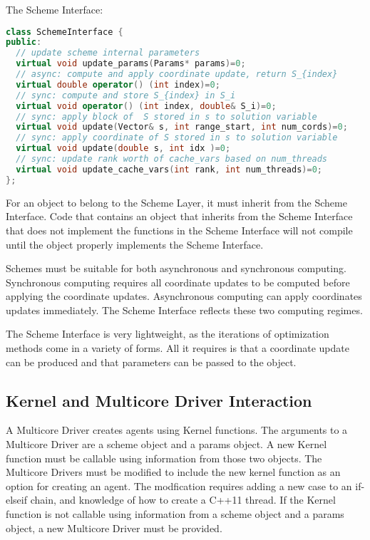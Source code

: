 The Scheme Interface:
\begin{lstlisting}[language=C++]
class SchemeInterface {
public:
  // update scheme internal parameters
  virtual void update_params(Params* params)=0;
  // async: compute and apply coordinate update, return S_{index}
  virtual double operator() (int index)=0;
  // sync: compute and store S_{index} in S_i
  virtual void operator() (int index, double& S_i)=0;
  // sync: apply block of  S stored in s to solution variable
  virtual void update(Vector& s, int range_start, int num_cords)=0;
  // sync: apply coordinate of S stored in s to solution variable
  virtual void update(double s, int idx )=0;
  // sync: update rank worth of cache_vars based on num_threads
  virtual void update_cache_vars(int rank, int num_threads)=0;
};
\end{lstlisting}
For an object to belong to the Scheme Layer, it must inherit from the Scheme Interface.
Code that contains an object that inherits from the Scheme Interface that does not implement the functions in the Scheme Interface will not compile until the object properly implements the Scheme Interface.

Schemes must be suitable for both asynchronous and synchronous computing. Synchronous computing requires all coordinate updates to be computed before applying the coordinate updates. Asynchronous computing can apply coordinates updates immediately. The Scheme Interface reflects these two computing regimes.

The Scheme Interface is very lightweight, as the iterations of optimization methods come in a variety of forms.  All it requires is that a coordinate update can be produced and that parameters can be passed to the object.

 


\subsection{Kernel and Multicore Driver Interaction}

A Multicore Driver creates agents using Kernel functions. The arguments to a Multicore Driver are a scheme object and a params object. A new Kernel function must be callable using information from those two objects. The Multicore Drivers must be modified to include the new kernel function as an option for creating an agent. The modfication requires adding a new case to an if-elseif chain, and knowledge of how to create a C++11 thread. If the Kernel function is not callable using information from a scheme object and a params object, a new Multicore Driver must be provided.

